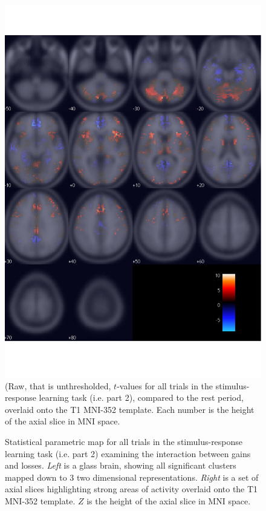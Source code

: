 \documentclass[doc,12pt]{apa}        %
\begin{document}
\begin{figure}[tp]
	\includegraphics{f_map_gl_raw_t}
    \centering
	\caption{(Raw, that is unthresholded, $t$-values for all trials in the stimulus-response learning task (i.e. part 2), compared to the rest period,  overlaid onto the T1 MNI-352 template.   Each number is the height of the axial slice in MNI space.}
	\label{fig:glraw}
\end{figure}

\begin{figure}[tp]
    \centering
	\caption{Statistical parametric map for all trials in the stimulus-response learning task (i.e. part 2) examining the interaction between gains and losses.  \emph{Left} is a glass brain, showing all significant clusters mapped down to 3 two dimensional representations.  \emph{Right} is a set of axial slices highlighting strong areas of activity overlaid onto the T1 MNI-352 template.  $Z$ is the height of the axial slice in MNI space.}
	\label{fig:gxl}
\end{figure}
\end{document}
